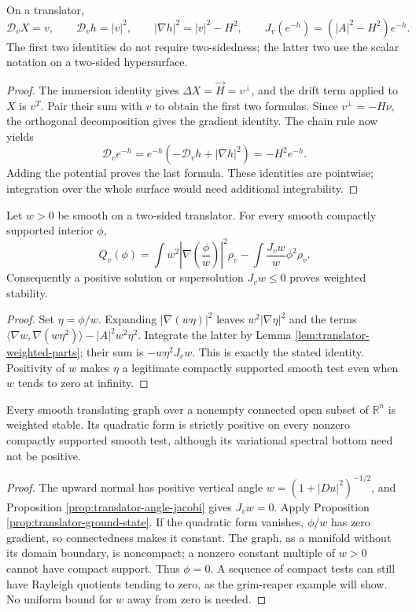 \begin{proposition}\label{prop:translator-height-drift}
On a translator,
\[
 \mathcal D_vX=v,\qquad \mathcal D_vh=|v|^2,\qquad
 |\nabla h|^2=|v|^2-H^2,
 \qquad J_v(e^{-h})=(|A|^2-H^2)e^{-h}.
\]
The first two identities do not require two-sidedness; the latter two use the scalar notation on a two-sided hypersurface.
\end{proposition}
\begin{proof}
The immersion identity gives $\Delta X=\vec H=v^\perp$, and the drift term applied to $X$ is $v^T$. Pair their sum with $v$ to obtain the first two formulas. Since $v^\perp=-H\nu$, the orthogonal decomposition gives the gradient identity. The chain rule now yields
\[
 \mathcal D_ve^{-h}=e^{-h}(-\mathcal D_vh+|\nabla h|^2)=-H^2e^{-h}.
\]
Adding the potential proves the last formula. These identities are pointwise; integration over the whole surface would need additional integrability.
\end{proof}

\begin{proposition}\label{prop:translator-ground-state}
Let $w>0$ be smooth on a two-sided translator. For every smooth compactly supported interior $\phi$,
\[
 Q_v(\phi)=\int w^2\left|\nabla\left(\frac\phi w\right)\right|^2\rho_v
 -\int\frac{J_vw}{w}\phi^2\rho_v.
\]
Consequently a positive solution or supersolution $J_vw\le0$ proves weighted stability.
\end{proposition}
\begin{proof}
Set $\eta=\phi/w$. Expanding $|\nabla(w\eta)|^2$ leaves $w^2|\nabla\eta|^2$ and the terms
$\langle\nabla w,\nabla(w\eta^2)\rangle-|A|^2w^2\eta^2$. Integrate the latter by Lemma \ref{lem:translator-weighted-parts}; their sum is $-w\eta^2J_vw$. This is exactly the stated identity. Positivity of $w$ makes $\eta$ a legitimate compactly supported smooth test even when $w$ tends to zero at infinity.
\end{proof}

\begin{corollary}\label{cor:translating-graph-weighted-stability}
Every smooth translating graph over a nonempty connected open subset of $\mathbb R^n$ is weighted stable. Its quadratic form is strictly positive on every nonzero compactly supported smooth test, although its variational spectral bottom need not be positive.
\end{corollary}
\begin{proof}
The upward normal has positive vertical angle $w=(1+|Du|^2)^{-1/2}$, and Proposition \ref{prop:translator-angle-jacobi} gives $J_vw=0$. Apply Proposition \ref{prop:translator-ground-state}. If the quadratic form vanishes, $\phi/w$ has zero gradient, so connectedness makes it constant. The graph, as a manifold without its domain boundary, is noncompact; a nonzero constant multiple of $w>0$ cannot have compact support. Thus $\phi=0$. A sequence of compact tests can still have Rayleigh quotients tending to zero, as the grim-reaper example will show. No uniform bound for $w$ away from zero is needed.
\end{proof}

